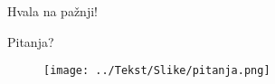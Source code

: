 \documentclass[utf8]{beamer}
\begin{document}
\section*{}
\begin{frame}{}
\center
\Huge{Hvala na pažnji!}
\end{frame}

\begin{frame}{}
\center
\Huge{Pitanja?}
\begin{figure}[h]
  \centering
    \texttt{[image: ../Tekst/Slike/pitanja.png]}
	\end{figure}
\end{frame}
\end{document}
